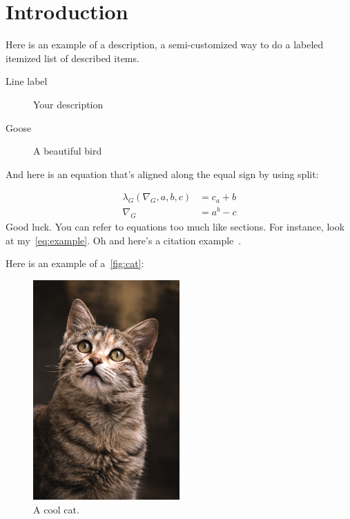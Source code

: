 \newpage\section{Introduction} \label{sec:intro}
Here is an example of a description, a semi-customized way to do a labeled itemized list of described items.

\begin{description}
    \item[Line label] Your description
    \item[Goose] A beautiful bird
\end{description}

\noindent
And here is an equation that's aligned along the equal sign by using split:

\begin{equation} \label{eq:example}
\begin{split}
    \lambda_G(\nabla_G, a, b, c) & = c_a + b \\
    \nabla_G & = a^b - c
\end{split}
\end{equation}
\noindent
Good luck. You can refer to equations too much like sections. For instance, look at my~\autoref{eq:example}. Oh and here's a citation example~\cite{Goodfellow2014GenerativeNetworks}.

Here is an example of a~\autoref{fig:cat}:

\begin{figure}[H] \centering %

    \includegraphics[width=0.5\textwidth]{figures/cat.png}

    \caption{A cool cat.}

    \label{fig:cat}

\end{figure}

